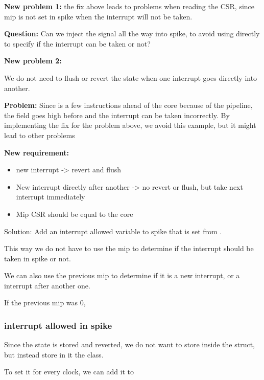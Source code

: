 \textbf{New problem 1:} the fix above leads to problems when reading the CSR, since mip is not set in spike when the interrupt will not be taken.

\textbf{Question:} Can we inject the  signal all the way into spike, to avoid using  directly to specify if the interrupt can be taken or not?

\textbf{New problem 2:}

We do not need to flush or revert the state when one interrupt goes directly into another. 


\textbf{Problem:} Since  is a few instructions ahead of the core because of the pipeline, the  field goes high before and the interrupt can be taken incorrectly. By implementing the fix for the problem above, we avoid this example, but it might lead to other problems


\textbf{New requirement:}

\begin{itemize}
    \item new interrupt -> revert and flush
    \item New interrupt directly after another -> no revert or flush, but take next interrupt immediately
    \item Mip CSR should be equal to the core
\end{itemize}

Solution: Add an interrupt allowed variable to spike that is set from .

This way we do not have to use the mip to determine if the interrupt should be taken in spike or not.

We can also use the previous mip to determine if it is a new interrupt, or a interrupt after another one.

If the previous mip was 0, 

\subsubsection{interrupt allowed in spike}

Since the state is stored and reverted, we do not want to store  inside the  struct, but instead store in it the  class. 

To set it for every clock, we can add it to 

